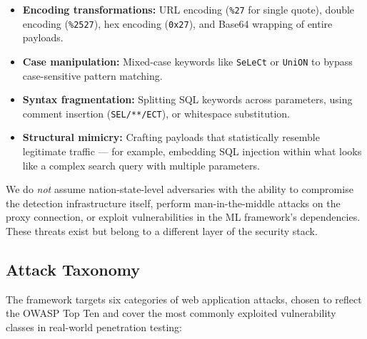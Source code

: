 \documentclass[journal,onecolumn]{IEEEtran}
\begin{document}
\begin{itemize}
\item \textbf{Encoding transformations:} URL encoding (\texttt{\%27} for single quote), double encoding (\texttt{\%2527}), hex encoding (\texttt{0x27}), and Base64 wrapping of entire payloads.
\item \textbf{Case manipulation:} Mixed-case keywords like \texttt{SeLeCt} or \texttt{UniON} to bypass case-sensitive pattern matching.
\item \textbf{Syntax fragmentation:} Splitting SQL keywords across parameters, using comment insertion (\texttt{SEL/**/ECT}), or whitespace substitution.
\item \textbf{Structural mimicry:} Crafting payloads that statistically resemble legitimate traffic --- for example, embedding SQL injection within what looks like a complex search query with multiple parameters.
\end{itemize}

We do \textit{not} assume nation-state-level adversaries with the ability to compromise the detection infrastructure itself, perform man-in-the-middle attacks on the proxy connection, or exploit vulnerabilities in the ML framework's dependencies. These threats exist but belong to a different layer of the security stack.

\subsection{Attack Taxonomy}

The framework targets six categories of web application attacks, chosen to reflect the OWASP Top Ten and cover the most commonly exploited vulnerability classes in real-world penetration testing:
\end{document}
